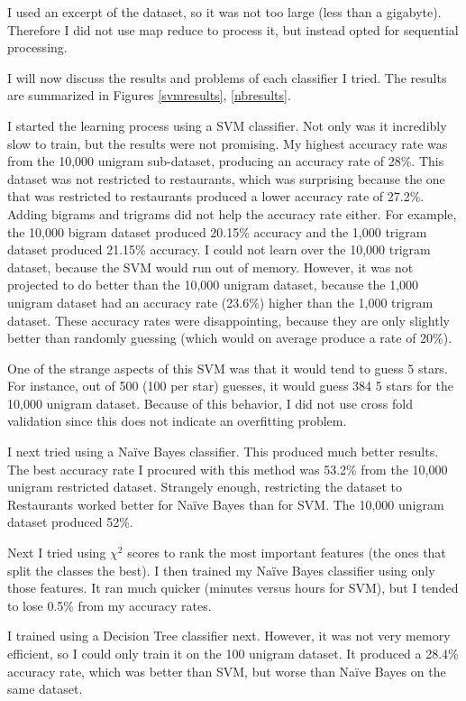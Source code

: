 \documentclass[11pt, onecolumn]{IEEEtran}
\begin{document}
I used an excerpt of the dataset, so it was not too large (less than a gigabyte). Therefore I did not use map reduce to process it, but instead opted for sequential processing.

I will now discuss the results and problems of each classifier I tried. The results are summarized in Figures \ref{svmresults}, \ref{nbresults}.

I started the learning process using a SVM classifier. Not only was it incredibly slow to train, but the results were not promising. My highest accuracy rate was from the 10,000 unigram sub-dataset, producing an accuracy rate of 28\%. This dataset was not restricted to restaurants, which was surprising because the one that was restricted to restaurants produced a lower accuracy rate of 27.2\%. Adding bigrams and trigrams did not help the accuracy rate either. For example, the 10,000 bigram dataset produced 20.15\% accuracy and the 1,000 trigram dataset produced 21.15\% accuracy. I could not learn over the 10,000 trigram dataset, because the SVM would run out of memory. However, it was not projected to do better than the 10,000 unigram dataset, because the 1,000 unigram dataset had an accuracy rate (23.6\%) higher than the 1,000 trigram dataset. These accuracy rates were disappointing, because they are only slightly better than randomly guessing (which would on average produce a rate of 20\%).

One of the strange aspects of this SVM was that it would tend to guess 5 stars. For instance, out of 500 (100 per star) guesses, it would guess 384 5 stars for the 10,000 unigram dataset. Because of this behavior, I did not use cross fold validation since this does not indicate an overfitting problem.

I next tried using a Na\"{i}ve Bayes classifier. This produced much better results. The best accuracy rate I procured with this method was 53.2\% from the 10,000 unigram restricted dataset. Strangely enough, restricting the dataset to Restaurants worked better for Na\"{i}ve Bayes than for SVM. The 10,000 unigram dataset produced 52\%.

Next I tried using $\chi^2$ scores to rank the most important features (the ones that split the classes the best). I then trained my Na\"{i}ve Bayes classifier using only those features. It ran much quicker (minutes versus hours for SVM), but I tended to lose 0.5\% from my accuracy rates.

I trained using a Decision Tree classifier next. However, it was not very memory efficient, so I could only train it on the 100 unigram dataset. It produced a 28.4\% accuracy rate, which was better than SVM, but worse than Na\"{i}ve Bayes on the same dataset. 
\end{document}
